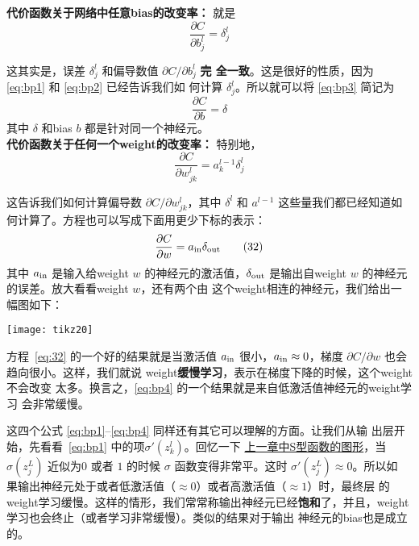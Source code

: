 \textbf{代价函数关于网络中任意\gls*{bias}的改变率：} 就是
\begin{equation}
  \frac{\partial C}{\partial b^l_j} = \delta^l_j
  \label{eq:bp3}\tag{BP3}
\end{equation}

这其实是，误差 $\delta^l_j$ 和偏导数值 $\partial C / \partial b^l_j$ \textbf{完
  全一致}。这是很好的性质，因为 \eqref{eq:bp1} 和 \eqref{eq:bp2} 已经告诉我们如
何计算 $\delta^l_j$。所以就可以将 \eqref{eq:bp3} 简记为
\begin{equation}
  \frac{\partial C}{\partial b} = \delta
  \label{eq:31}\tag{31}
\end{equation}
其中 $\delta$ 和\gls*{bias} $b$ 都是针对同一个神经元。\\

\textbf{代价函数关于任何一个\gls*{weight}的改变率：} 特别地，
\begin{equation}
  \frac{\partial C}{\partial w^l_{jk}} = a^{l-1}_k \delta^l_j
  \label{eq:bp4}\tag{BP4}
\end{equation}

这告诉我们如何计算偏导数 $\partial C/\partial w_{jk}^l$，其中 $\delta^l$ 和
$a^{l-1}$ 这些量我们都已经知道如何计算了。方程也可以写成下面用更少下标的表示：
\begin{equation}
  \frac{\partial
    C}{\partial w} = a_{\rm in} \delta_{\rm out}
  \label{eq:32}\tag{32}
\end{equation}
其中 $a_{\rm in}$ 是输入给\gls*{weight} $w$ 的神经元的激活值，$\delta_{\rm out}$
是输出自\gls*{weight} $w$ 的神经元的误差。放大看看\gls*{weight} $w$，还有两个由
这个\gls*{weight}相连的神经元，我们给出一幅图如下：

\begin{center}
  \texttt{[image: tikz20]}
\end{center}

方程~\eqref{eq:32} 的一个好的结果就是当激活值 $a_{\rm in}$ 很小，$a_{\rm in}
\approx 0$，梯度 $\partial C/\partial w$ 也会趋向很小。这样，我们就说%
\gls*{weight}\textbf{缓慢学习}，表示在梯度下降的时候，这个\gls*{weight}不会改变
太多。换言之，\eqref{eq:bp4} 的一个结果就是来自低激活值神经元的\gls*{weight}学习
会非常缓慢。

这四个公式 \eqref{eq:bp1}--\eqref{eq:bp4} 同样还有其它可以理解的方面。让我们从输
出层开始，先看看~\eqref{eq:bp1} 中的项$\sigma'(z_k^l)$。回忆一下%
\hyperref[fig:StepFunction]{上一章中S型函数的图形}，当 $\sigma(z^L_j)$ 近似为$0$
或者 $1$ 的时候 $\sigma$ 函数变得非常平。这时 $\sigma'(z^L_j) \approx 0$。所以如
果输出神经元处于或者低激活值（$\approx 0$）或者高激活值（$\approx 1$）时，最终层
的\gls*{weight}学习缓慢。这样的情形，我们常常称输出神经元已经\textbf{饱和}了，并且，\gls*{weight}学习也会终止（或者学习非常缓慢）。类似的结果对于输出
神经元的\gls*{bias}也是成立的。


